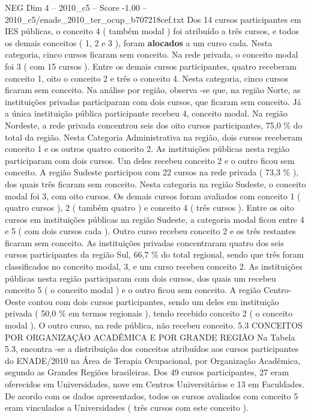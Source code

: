 \begin{textsample}{NEG Dim 4 – 2010\_c5 – Score -1.00 – 2010\_c5/enade\_2010\_ter\_ocup\_b707218cef.txt}
Dos 14 cursos participantes em IES públicas, o conceito 4 ( também modal ) foi atribuído a três cursos, e todos os demais conceitos ( 1, 2 e 3 ), foram \textbf{alocados} a um curso cada.
Nesta categoria, cinco cursos ficaram sem conceito.
Na rede privada, o conceito modal foi 3 ( com 15 cursos ).
Entre os demais cursos participantes, quatro receberam conceito 1, oito o conceito 2 e três o conceito 4.
Nesta categoria, cinco cursos ficaram sem conceito.
Na análise por região, observa -se que, na região Norte, as instituições privadas participaram com dois cursos, que ficaram sem conceito.
Já a única instituição pública participante recebeu 4, conceito modal.
Na região Nordeste, a rede privada concentrou seis dos oito cursos participantes, 75,0 \% do total da região.
Nesta Categoria Administrativa na região, dois cursos receberam conceito 1 e os outros quatro conceito 2.
As instituições públicas nesta região participaram com dois cursos.
Um deles recebeu conceito 2 e o outro ficou sem conceito.
A região Sudeste participou com 22 cursos na rede privada ( 73,3 \% ), dos quais três ficaram sem conceito.
Nesta categoria na região Sudeste, o conceito modal foi 3, com oito cursos.
Os demais cursos foram avaliados com conceito 1 ( quatro cursos ), 2 ( também quatro ) e conceito 4 ( três cursos ).
Entre os oito cursos em instituições públicas na região Sudeste, a categoria modal ficou entre 4 e 5 ( com dois cursos cada ).
Outro curso recebeu conceito 2 e os três restantes ficaram sem conceito.
As instituições privadas concentraram quatro dos seis cursos participantes da região Sul, 66,7 \% do total regional, sendo que três foram classificados no conceito modal, 3, e um curso recebeu conceito 2.
As instituições públicas nesta região participaram com dois cursos, dos quais um recebeu conceito 5 ( o conceito modal ) e o outro ficou sem conceito.
A região Centro-Oeste contou com dois cursos participantes, sendo um deles em instituição privada ( 50,0 \% em termos regionais ), tendo recebido conceito 2 ( o conceito modal ).
O outro curso, na rede pública, não recebeu conceito. 5.3 CONCEITOS POR ORGANIZAÇÃO ACADÊMICA E POR GRANDE REGIÃO Na Tabela 5.3, encontra -se a distribuição dos conceitos atribuídos aos cursos participantes do ENADE/2010 na Área de Terapia Ocupacional, por Organização Acadêmica, segundo as Grandes Regiões brasileiras.
Dos 49 cursos participantes, 27 eram oferecidos em Universidades, nove em Centros Universitários e 13 em Faculdades.
De acordo com os dados apresentados, todos os cursos avaliados com conceito 5 eram vinculados a Universidades ( três cursos com este conceito ).

\end{textsample}
